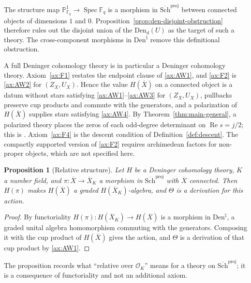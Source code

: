 \documentclass[11pt]{amsart}
\theoremstyle{plain}
\newtheorem{proposition}[theorem]{Proposition}
\theoremstyle{definition}
\theoremstyle{remark}
\numberwithin{equation}{section}
\newcommand{\F}{\mathbb{F}}
\newcommand{\Xbar}{\overline{X}}
\newcommand{\cO}{\mathcal{O}}
\newcommand{\Schbar}{\overline{\mathrm{Sch}}}
\newcommand{\Den}{\mathrm{Den}}
\DeclareMathOperator{\Spec}{Spec}
\DeclareMathOperator{\Rea}{Re}
\renewcommand{\Re}{\Rea}
\begin{document}
The structure map $\mathbb P^1_{\F_q}\to\Spec\F_q$ is a morphism in
$\Schbar^{\mathrm{proj}}$ between connected objects of dimensions
$1$ and $0$. Proposition~\ref{prop:den-disjoint-obstruction} therefore
rules out the disjoint union of the $\Den_d(U)$ as the target of such a
theory. The cross-component morphisms in $\Den^\natural$ remove this
definitional obstruction.

A full Deninger cohomology theory is in particular a Deninger
cohomology theory. Axiom~\ref{ax:F1} restates the endpoint clause of
\ref{ax:AW1}, and \ref{ax:F2} is \ref{ax:AW2} for $(Z_X,U_X)$. Hence
the value $H(\Xbar)$ on a connected object is a datum without stars
satisfying \ref{ax:AW1}--\ref{ax:AW3} for $(Z_X,U_X)$, pullbacks
preserve cup products and commute with the generators, and a
polarization of $H(\Xbar)$ supplies stars satisfying \ref{ax:AW4}.
By Theorem~\ref{thm:main-general}, a polarized theory places the zeros
of each odd-degree determinant on $\Re s=j/2$; this is
\cite[Conjecture~2.3(v), p.~522]{FlachMorin2020DeningerWeilArakelov}.
Axiom~\ref{ax:F4} is the descent condition of
Definition~\ref{def:descent}. The compactly supported version of
\ref{ax:F2} requires archimedean factors for non-proper objects, which
are not specified here.

\begin{proposition}[Relative structure]
\label{prop:relative-structure}
Let $H$ be a Deninger cohomology theory, $K$ a number field, and
$\pi:\Xbar\to\Xbar_K$ a morphism in $\Schbar^{\mathrm{proj}}$ with
$\Xbar$ connected. Then $H(\pi)$ makes $H(\Xbar)$ a graded
$H(\Xbar_K)$-algebra, and $\Theta$ is a derivation for this action.
\end{proposition}

\begin{proof}
By functoriality $H(\pi):H(\Xbar_K)\to H(\Xbar)$ is a morphism in
$\Den^\natural$, a graded unital algebra homomorphism commuting with the
generators. Composing it with the cup product of $H(\Xbar)$ gives the
action, and $\Theta$ is a derivation of that cup product by
\ref{ax:AW1}.
\end{proof}

The proposition records what ``relative over $\cO_K$'' means for a
theory on $\Schbar^{\mathrm{proj}}$; it is a consequence of
functoriality and not an additional axiom.
\end{document}

